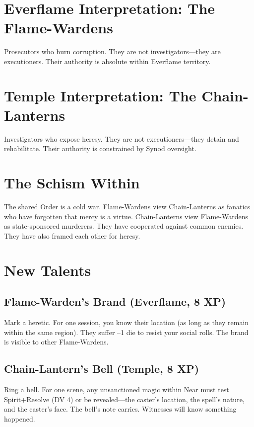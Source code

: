 \documentclass{book}
\begin{document}
\section{Everflame Interpretation: The Flame-Wardens}

Prosecutors who burn corruption. They are not investigators---they are executioners. Their authority is absolute within Everflame territory.

\section{Temple Interpretation: The Chain-Lanterns}

Investigators who expose heresy. They are not executioners---they detain and rehabilitate. Their authority is constrained by Synod oversight.

\section{The Schism Within}

The shared Order is a cold war. Flame-Wardens view Chain-Lanterns as fanatics who have forgotten that mercy is a virtue. Chain-Lanterns view Flame-Wardens as state-sponsored murderers. They have cooperated against common enemies. They have also framed each other for heresy.

\section{New Talents}

\subsection{Flame-Warden's Brand (Everflame, 8 XP)}

Mark a heretic. For one session, you know their location (as long as they remain within the same region). They suffer --1 die to resist your social rolls. The brand is visible to other Flame-Wardens.

\subsection{Chain-Lantern's Bell (Temple, 8 XP)}

Ring a bell. For one scene, any unsanctioned magic within Near must test Spirit+Resolve (DV 4) or be revealed---the caster's location, the spell's nature, and the caster's face. The bell's note carries. Witnesses will know something happened.
\end{document}
